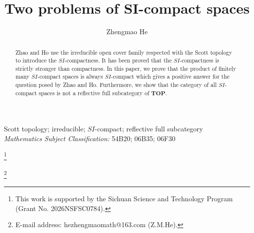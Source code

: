 \documentclass[preprint,12pt]{elsarticle}
\numberwithin{equation}{section}
\newcommand\blfootnote[1]{%
\begingroup
\renewcommand\thefootnote{}\footnote{#1}%
\addtocounter{footnote}{-1}%
\endgroup
}
\begin{document}
\begin{frontmatter}



\title{Two problems of SI-compact spaces}


\author{Zhengmao He}
\address{School of Sciences, Southwest Petroleum University,Chengdu 610500, China}
\begin{abstract} Zhao and Ho use the irreducible open cover family respected with the Scott topology to introduce the $SI$-compactness. It has been proved that the $SI$-compactness is strictly stronger than compactness. In this paper, we prove that the product of finitely many $SI$-compact spaces is always $SI$-compact which gives a positive answer for the question posed by Zhao and Ho. Furthermore, we show that the category of all $SI$-compact spaces is not a reflective full subcategory of $\mathbf{TOP}$.
\end{abstract}
\begin{keyword}  Scott topology; irreducible; $SI$-compact; reflective full subcategory\\
\vspace*{0.2cm}
{\em Mathematics Subject Classification:} 54B20; 06B35; 06F30
\end{keyword}


\end{frontmatter}
\blfootnote{This work is supported by the Sichuan Science and Technology Program (Grant No. 2026NSFSC0784).}
\blfootnote{E-mail address: hezhengmaomath@163.com (Z.M.He).}
\end{document}

